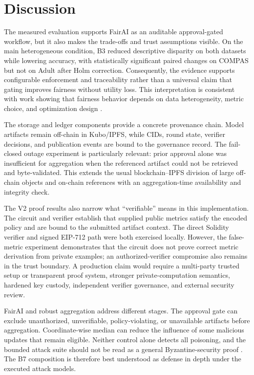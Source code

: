\documentclass[futureinternet,article,submit,pdftex,moreauthors]{Definitions/mdpi}
\begin{document}
\section{Discussion}
\label{sec:discussion}

The measured evaluation supports FairAI as an auditable approval-gated workflow, but it also makes the trade-offs and trust assumptions visible. On the main heterogeneous condition, B3 reduced descriptive disparity on both datasets while lowering accuracy, with statistically significant paired changes on COMPAS but not on Adult after Holm correction. Consequently, the evidence supports configurable enforcement and traceability rather than a universal claim that gating improves fairness without utility loss. This interpretation is consistent with work showing that fairness behavior depends on data heterogeneity, metric choice, and optimization design \cite{intro_4,intro_5,rw_16}.

The storage and ledger components provide a concrete provenance chain. Model artifacts remain off-chain in Kubo/IPFS, while CIDs, round state, verifier decisions, and publication events are bound to the governance record. The fail-closed outage experiment is particularly relevant: prior approval alone was insufficient for aggregation when the referenced artifact could not be retrieved and byte-validated. This extends the usual blockchain--IPFS division of large off-chain objects and on-chain references \cite{intro_8,rw_21} with an aggregation-time availability and integrity check.

The V2 proof results also narrow what ``verifiable'' means in this implementation. The circuit and verifier establish that supplied public metrics satisfy the encoded policy and are bound to the submitted artifact context. The direct Solidity verifier and signed EIP-712 path were both exercised locally. However, the false-metric experiment demonstrates that the circuit does not prove correct metric derivation from private examples; an authorized-verifier compromise also remains in the trust boundary. A production claim would require a multi-party trusted setup or transparent proof system, stronger private-computation semantics, hardened key custody, independent verifier governance, and external security review.

FairAI and robust aggregation address different stages. The approval gate can exclude unauthorized, unverifiable, policy-violating, or unavailable artifacts before aggregation. Coordinate-wise median can reduce the influence of some malicious updates that remain eligible. Neither control alone detects all poisoning, and the bounded attack suite should not be read as a general Byzantine-security proof \cite{intro_13,rw_26,rw_27,rw_28}. The B7 composition is therefore best understood as defense in depth under the executed attack models.
\end{document}

